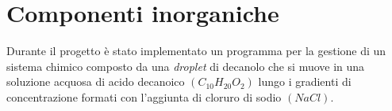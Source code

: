 \section{Componenti inorganiche}
\label{sec:123}
Durante il progetto è stato implementato un programma per la gestione di un sistema chimico composto da una \emph{droplet} di decanolo che si muove in una soluzione acquosa di acido decanoico $(C_{10}H_{20}O_{2})$ lungo i gradienti di concentrazione formati con l'aggiunta di cloruro di sodio $(NaCl)$. 



